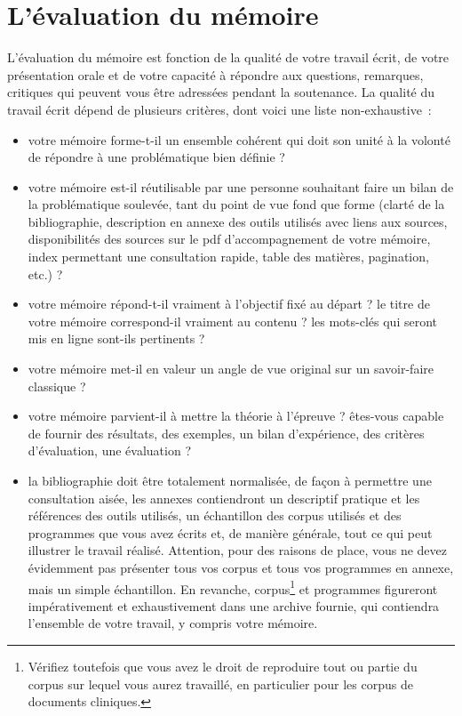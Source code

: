 \section{L'évaluation du mémoire}
L'évaluation du mémoire est fonction de la qualité de votre travail écrit, de votre présentation orale et de votre capacité à répondre aux questions, remarques, critiques qui peuvent vous être adressées pendant la soutenance. La qualité du travail écrit dépend de plusieurs critères, dont voici une liste non-exhaustive~:
%
\begin{itemize}
\item votre mémoire forme-t-il un ensemble cohérent qui doit son unité à la volonté de répondre à une problématique bien définie ?
\item votre mémoire est-il réutilisable par une personne souhaitant faire un bilan de la problématique soulevée, tant du point de vue fond que forme (clarté de la bibliographie, description en annexe des outils utilisés avec liens aux sources, disponibilités des sources sur le pdf d'accompagnement de votre mémoire, index permettant une consultation rapide, table des matières, pagination, etc.) ?
\item votre mémoire répond-t-il vraiment à l'objectif fixé au départ ? le titre de votre mémoire correspond-il vraiment au contenu ? les mots-clés qui seront mis en ligne sont-ils pertinents ?
\item votre mémoire met-il en valeur un angle de vue original sur un savoir-faire classique ?
\item votre mémoire parvient-il à mettre la théorie à l'épreuve ? êtes-vous capable de fournir des résultats, des exemples, un bilan d'expérience, des critères d'évaluation, une évaluation ?
\item la bibliographie doit être totalement normalisée, de façon à permettre une consultation aisée, les annexes contiendront un descriptif pratique et les références des outils utilisés, un échantillon des corpus utilisés et des programmes que vous avez écrits et, de manière générale, tout ce qui peut illustrer le travail réalisé. Attention, pour des raisons de place, vous ne devez évidemment pas présenter tous vos corpus et tous vos programmes en annexe, mais un simple échantillon. En revanche, corpus\footnote{Vérifiez toutefois que vous avez le droit de reproduire tout ou partie du corpus sur lequel vous aurez travaillé, en particulier pour les corpus de documents cliniques.} et programmes figureront impérativement et exhaustivement dans une archive fournie, qui contiendra l'ensemble de votre travail, y compris votre mémoire. 
\end{itemize}

